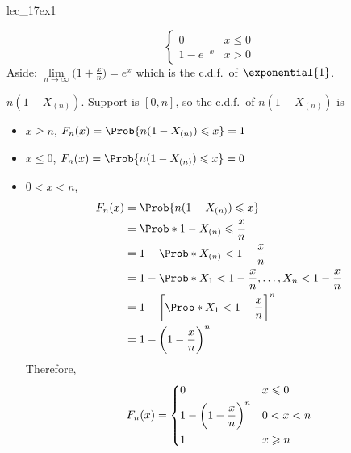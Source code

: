 \begin{Example}{}{lec_17ex1}
\begin{enumerate}[label=(\roman*)]
\begin{itemize}
\[                            \begin{cases}
                                0        & x\leqslant 0 \\
                                1-e^{-x} & x>0
                            \end{cases} \]
                        Aside: $
                            \displaystyle  \lim\limits_{{n} \to {\infty}}\biggl(1+\frac{x}{n}\biggr)=
                            e^x $
                        which is the c.d.f.\ of $ \exponential{1} $.
              \end{itemize}
              $ n(1-X_{(n)}) $. Support is $ [0,n] $, so the c.d.f.\ of
              $ n(1-X_{(n)}) $ is
              \begin{itemize}
                  \item $ x\geqslant n $, $ F_n(x)=
                            \Prob{n(1-X_{(n)})\leqslant x}=1 $
                  \item $ x\leqslant 0 $, $ F_n(x)=
                            \Prob{n(1-X_{(n)})\leqslant x}=0 $
                  \item $ 0<x<n $,
                        \begin{align*}
                            F_n(x)
                             & = \Prob{n(1-X_{(n)})\leqslant x}             \\
                             & =\Prob*{1-X_{(n)}\leqslant \frac{x}{n}}      \\
                             & =1-\Prob*{X_{(n)}<1-\frac{x}{n}}             \\
                             & =1-\Prob*{X_1<1-\frac{x}{n},\ldots,
                            X_n<1-\frac{x}{n}}                              \\
                             & =1-\biggl[\Prob*{X_1<1-\frac{x}{n}}\biggr]^n \\
                             & =1-\biggl(1-\frac{x}{n}\biggr)^n
                        \end{align*}
                        Therefore,
                        \[ F_n(x)=\begin{dcases}
                                0                               & x\leqslant 0 \\
                                1-\biggl(1-\frac{x}{n}\biggr)^n & 0<x<n        \\
                                1                               & x\geqslant n
                            \end{dcases} \]

\end{itemize}
\end{enumerate}
\end{Example}
